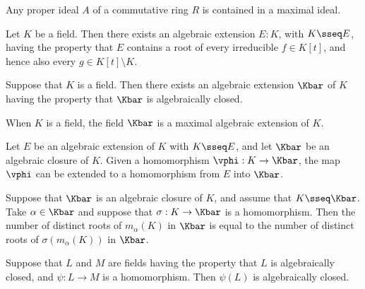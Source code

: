 \documentclass{article}
\begin{document}
  \begin{tproposition}
    Any proper ideal \( A \) of a commutative ring \( R \) is contained in a maximal ideal.
  \end{tproposition}

  \begin{tlemma}
    Let \( K \) be a field.
    Then there exists an algebraic extension \( E:K \), with \( K\sseq E \), having the property that \( E \) contains a root of every irreducible \( f\in K[t] \), and hence also every \( g\in K[t]\setminus K \).
  \end{tlemma}

  \begin{ttheorem}
    Suppose that \( K \) is a field.
    Then there exists an algebraic extension \( \Kbar \) of \( K \) having the property that \( \Kbar \) is algebraically closed.
  \end{ttheorem}

  \begin{tcorollary}
    When \( K \) is a field, the field \( \Kbar \) is a maximal algebraic extension of \( K \).
  \end{tcorollary}

  \begin{ttheorem}
    Let \( E \) be an algebraic extension of \( K \) with \( K\sseq E \), and let \( \Kbar \) be an algebraic closure of \( K \).
    Given a homomorphism \( \vphi:K\to \Kbar \), the map \( \vphi \) can be extended to a homomorphism from \( E \) into \( \Kbar \).
  \end{ttheorem}

  \begin{tcorollary}
    Suppose that \( \Kbar \) is an algebraic closure of \( K \), and assume that \( K\sseq \Kbar \).
    Take \( \alpha\in \Kbar \) and suppose that \( \sigma:K\to \Kbar \) is a homomorphism.
    Then the number of distinct roots of \( m_\alpha(K) \) in \( \Kbar \) is equal to the number of distinct roots of \( \sigma(m_\alpha(K)) \) in \( \Kbar \).
  \end{tcorollary}

  \begin{tproposition}
    Suppose that \( L \) and \( M \) are fields having the property that \( L \) is algebraically closed, and \( \psi : L \to M \) is a homomorphism.
    Then \( \psi(L) \) is algebraically closed.
  \end{tproposition}
\end{document}
